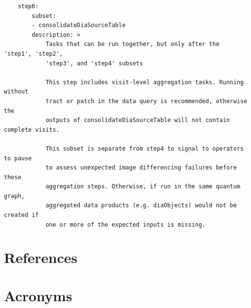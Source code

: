 \documentclass[DM,authoryear,toc]{lsstdoc}
\begin{document}
\begin{verbatim}
    step6:
        subset:
        - consolidateDiaSourceTable
        description: >
            Tasks that can be run together, but only after the 'step1', 'step2',
            'step3', and 'step4' subsets

            This step includes visit-level aggregation tasks. Running without
            tract or patch in the data query is recommended, otherwise the
            outputs of consolidateDiaSourceTable will not contain complete visits.

            This subset is separate from step4 to signal to operators to pause
            to assess unexpected image differencing failures before these
            aggregation steps. Otherwise, if run in the same quantum graph,
            aggregated data products (e.g. diaObjects) would not be created if
            one or more of the expected inputs is missing.

\end{verbatim}

\appendix
\section{References} \label{sec:bib}
\renewcommand{\refname}{} %


\section{Acronyms} \label{sec:acronyms}

\end{document}
